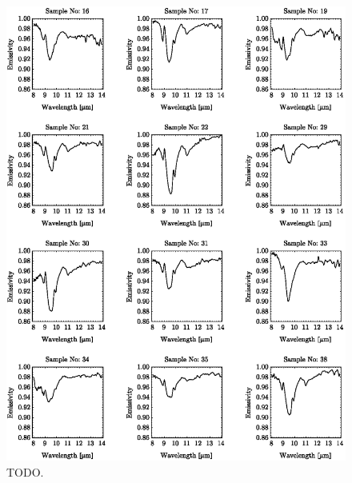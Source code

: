 \begin{appendices}
\begin{figure}[!t]
\centering
\includegraphics[width=0.95\linewidth]{pics/Chapter_05/spectral_library_pt2.eps}
\vspace{1.5 em}
\caption{TODO.}
\label{fig:SpoilSubstratesPreviewPt1}
\end{figure}

\end{appendices}
